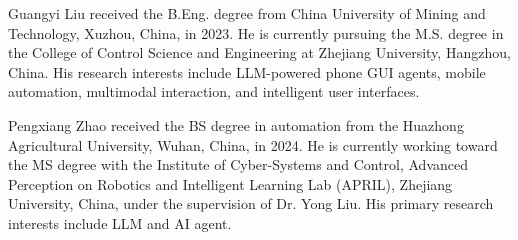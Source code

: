 \vspace{-3em}

\begin{IEEEbiography}{Guangyi Liu}
received the B.Eng. degree from China University of Mining and Technology, Xuzhou, China, in 2023. He is currently pursuing the M.S. degree in the College of Control Science and Engineering at Zhejiang University, Hangzhou, China. His research interests include LLM-powered phone GUI agents, mobile automation, multimodal interaction, and intelligent user interfaces.
\end{IEEEbiography}

\vspace{-3em}

\begin{IEEEbiography}{Pengxiang Zhao}
received the BS degree in automation from the Huazhong Agricultural University, Wuhan, China, in 2024. He is currently working toward the MS degree with the Institute of Cyber-Systems and Control, Advanced Perception on Robotics and Intelligent Learning Lab (APRIL), Zhejiang University, China, under the supervision of Dr. Yong Liu. His primary research interests include LLM and AI agent.
\end{IEEEbiography}

\vspace{-3em}


